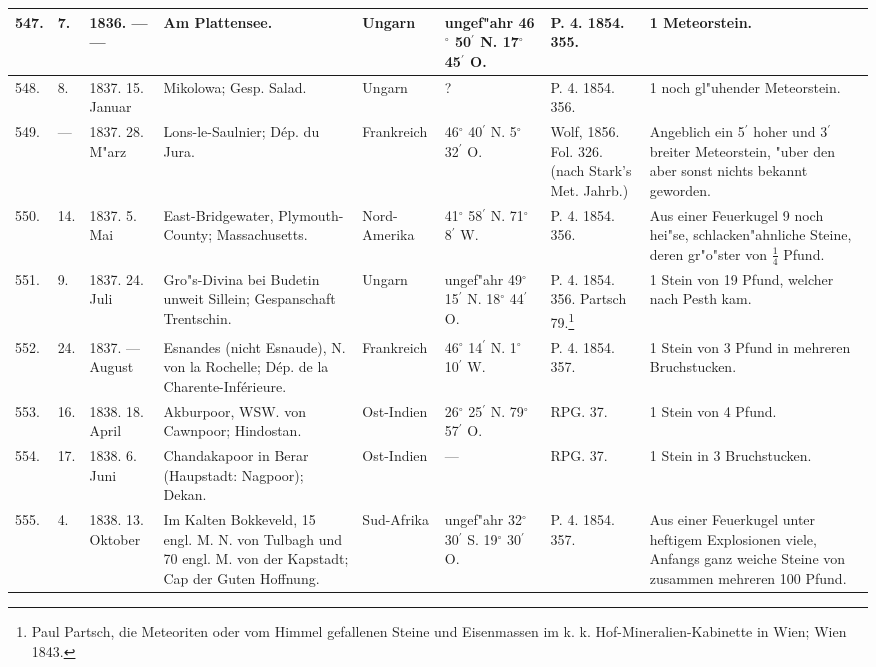 \documentclass[a4paper, 8pt, oneside, polutonikogreek, german]{article}
\begin{document}
\begin{center}
\begin{longtable}{| p{4mm} | p{2mm} | p{15mm} | p{25mm} | p{16mm} | p{12mm} | p{13mm} | p{20mm} |}
        547. & 7. & 1836. --- --- & Am Plattensee. & Ungarn & ungef"ahr 46$^\circ$ 50$^\prime$ N. 17$^\circ$ 45$^\prime$ O. & P. 4. 1854. 355. & 1 Meteorstein. \\ \hline
        548. & 8. & 1837. 15. Januar & Mikolowa; Gesp. Salad. & Ungarn & ? & P. 4. 1854. 356. & 1 noch gl"uhender Meteorstein. \\ \hline
        549. & --- & 1837. 28. M"arz & Lons-le-Saulnier; Dép. du Jura. & Frankreich & 46$^\circ$ 40$^\prime$ N. 5$^\circ$ 32$^\prime$ O. & Wolf, 1856. Fol. 326. (nach Stark's Met. Jahrb.) & Angeblich ein 5$^\prime$ hoher und 3$^\prime$ breiter Meteorstein, "uber den aber sonst nichts bekannt geworden. \\ \hline
        550. & 14. & 1837. 5. Mai & East-Bridgewater, Plymouth-County; Massachusetts. & Nord-Amerika & 41$^\circ$ 58$^\prime$ N. 71$^\circ$ 8$^\prime$ W. & P. 4. 1854. 356. & Aus einer Feuerkugel 9 noch hei"se, schlacken"ahnliche Steine, deren gr"o"ster von $\frac{1}{4}$ Pfund. \\ \hline
        551. & 9. & 1837. 24. Juli & Gro"s-Divina bei Budetin unweit Sillein; Gespanschaft Trentschin. & Ungarn & ungef"ahr 49$^\circ$ 15$^\prime$ N. 18$^\circ$ 44$^\prime$ O. & P. 4. 1854. 356. Partsch 79.\footnote{Paul Partsch, die Meteoriten oder vom Himmel gefallenen Steine und Eisenmassen im k. k. Hof-Mineralien-Kabinette in Wien; Wien 1843.} & 1 Stein von 19 Pfund, welcher nach Pesth kam. \\ \hline
        552. & 24. & 1837. --- August & Esnandes (nicht Esnaude), N. von la Rochelle; Dép. de la Charente-Inférieure. & Frankreich & 46$^\circ$ 14$^\prime$ N. 1$^\circ$ 10$^\prime$ W. & P. 4. 1854. 357. & 1 Stein von 3 Pfund in mehreren Bruchstucken. \\ \hline
        553. & 16. & 1838. 18. April & Akburpoor, WSW. von Cawnpoor; Hindostan. & Ost-Indien & 26$^\circ$ 25$^\prime$ N. 79$^\circ$ 57$^\prime$ O. & RPG. 37. & 1 Stein von 4 Pfund. \\ \hline
        554. & 17. & 1838. 6. Juni & Chandakapoor in Berar (Haupstadt: Nagpoor); Dekan. & Ost-Indien & --- & RPG. 37. & 1 Stein in 3 Bruchstucken. \\ \hline
        555. & 4. & 1838. 13. Oktober & Im Kalten Bokkeveld, 15 engl. M. N. von Tulbagh und 70 engl. M. von der Kapstadt; Cap der Guten Hoffnung. & Sud-Afrika & ungef"ahr 32$^\circ$ 30$^\prime$ S. 19$^\circ$ 30$^\prime$ O. & P. 4. 1854. 357. & Aus einer Feuerkugel unter heftigem Explosionen viele, Anfangs ganz weiche Steine von zusammen mehreren 100 Pfund. \\ \hline

\end{longtable}
\end{center}
\end{document}
